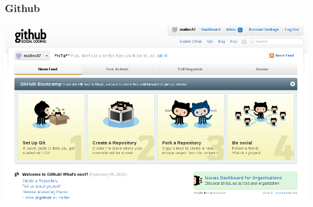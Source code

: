 \documentclass{beamer}
\begin{document}
\begin{frame}
  \frametitle{Github}
  \begin{center} \includegraphics[width=1\textwidth]{../img/github-screenshot} \end{center}
\end{frame}


\end{document}
